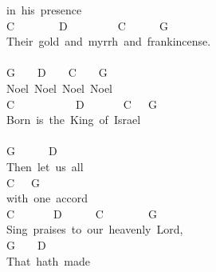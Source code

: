 \documentclass[]{book}
\begin{document}
in~his~presence~\\
\hspace*{0.333em}\hspace*{0.333em}\hspace*{0.333em}\hspace*{0.333em}\hspace*{0.333em}\hspace*{0.333em}C~~~~~~~~D~~~~~~~~~C~~~~~~G~~\\
Their~gold~and~myrrh~and~frankincense.~\\
~\\
\hspace*{0.333em}\hspace*{0.333em}G~~~~D~~~~C~~~~G\\
Noel~Noel~Noel~Noel\\
C~~~~~~~~~~~D~~~~~~~C~~~G\\
Born~is~the~King~of~Israel\\
~\\
\hspace*{0.333em}\hspace*{0.333em}\hspace*{0.333em}\hspace*{0.333em}\hspace*{0.333em}G~~~~~~D~~\\
Then~let~us~all\\
\hspace*{0.333em}\hspace*{0.333em}\hspace*{0.333em}\hspace*{0.333em}\hspace*{0.333em}C~~~G\\
with~one~accord~~\\
\hspace*{0.333em}\hspace*{0.333em}\hspace*{0.333em}\hspace*{0.333em}\hspace*{0.333em}C~~~~~~~D~~~~~~C~~~~~~~~G\\
Sing~praises~to~our~heavenly~Lord,~\\
\hspace*{0.333em}\hspace*{0.333em}\hspace*{0.333em}\hspace*{0.333em}\hspace*{0.333em}G~~~~D\\
That~hath~made\\
\end{document}

